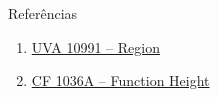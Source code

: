 \begin{frame}[fragile]{Referências}

    \begin{enumerate}
        \item \href{https://uva.onlinejudge.org/index.php?option=com_onlinejudge&Itemid=8&page=show_problem&category=24&problem=1932&mosmsg=Submission+received+with+ID+17971846}{UVA 10991 -- Region}

        \item \href{https://codeforces.com/problemset/problem/1036/A}{CF 1036A -- Function Height}
    \end{enumerate}

\end{frame}
